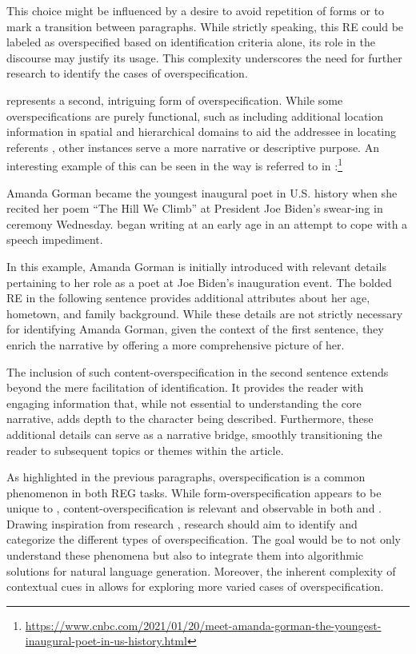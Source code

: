 This choice might be influenced by a desire to avoid repetition of forms or to mark a transition between paragraphs. While strictly speaking, this RE could be labeled as overspecified based on identification criteria alone, its role in the discourse may justify its usage. This complexity underscores the need for further research to identify the cases of overspecification.

 represents a second, intriguing form of overspecification. While some overspecifications are purely functional, such as including additional location information in spatial and hierarchical domains to aid the addressee in locating referents \citep{paraboni2007generating, paraboni2014reference}, other instances serve a more narrative or descriptive purpose. An interesting example of this can be seen in the way  is referred to in :\footnote{\url{https://www.cnbc.com/2021/01/20/meet-amanda-gorman-the-youngest-inaugural-poet-in-us-history.html}}

\begin{exe}
	\ex\label{ex:amandagorman} Amanda Gorman became the youngest inaugural poet in U.S. history when she recited her poem “The Hill We Climb” at President Joe Biden’s swear-ing in ceremony Wednesday.	
	 began writing at an early age in an attempt to cope with a speech impediment. 
\end{exe}

In this example, Amanda Gorman is initially introduced with relevant details pertaining to her role as a poet at Joe Biden's inauguration event. The bolded RE in the following sentence provides additional attributes about her age, hometown, and family background. While these details are not strictly necessary for identifying Amanda Gorman, given the context of the first sentence, they enrich the narrative by offering a more comprehensive picture of her. 

The inclusion of such content-overspecification in the second sentence extends beyond the mere facilitation of identification. It provides the reader with engaging information that, while not essential to understanding the core narrative, adds depth to the character being described. Furthermore, these additional details can serve as a narrative bridge, smoothly transitioning the reader to subsequent topics or themes within the article.


As highlighted in the previous paragraphs, overspecification is a common phenomenon in both REG tasks. While form-overspecification appears to be unique to \context, content-overspecification is relevant and observable in both \context and \shot. Drawing inspiration from \shot research \citep{paraboni2007generating,Gompel2019,Degen2020}, \context research should aim to identify and categorize the different types of overspecification. The goal would be to not only understand these phenomena but also to integrate them into algorithmic solutions for natural language generation. Moreover, the inherent complexity of contextual cues in \context allows for exploring more varied cases of overspecification. 

